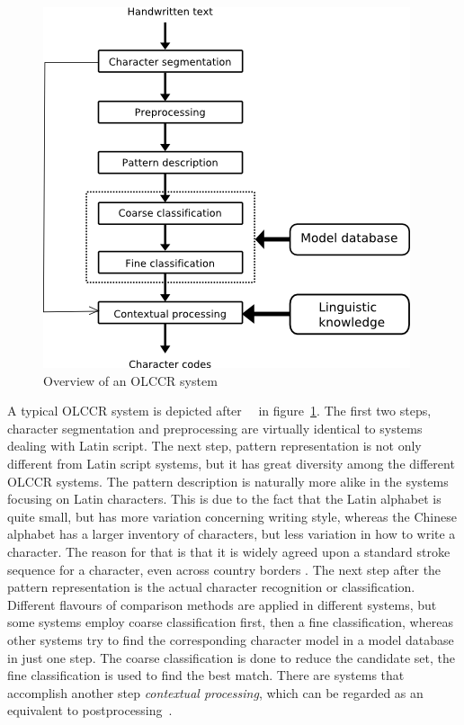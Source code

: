 \begin{figure}[htbp]
  \begin{center}
\includegraphics[scale=0.5]{images/olccrSystemOverview.png}
\caption{Overview of an OLCCR system}
\label{fig:olccrsystemoverview}
  \end{center}
\end{figure}

A typical OLCCR system is depicted 
after~~\citeyear{LiuJaegerNakagawa2004} in 
figure~\ref{fig:olccrsystemoverview}.
The first two steps, character segmentation and preprocessing are virtually
identical to systems dealing with Latin script. The next step, pattern 
representation is not only different from Latin script systems, but it has
great diversity among the different OLCCR systems.
The pattern description is naturally more alike in the systems focusing on 
Latin characters. This is due to the fact that the Latin alphabet is quite 
small, but has more variation concerning writing style, whereas the Chinese 
alphabet has a larger inventory of characters, but less variation in how to 
write a character. The reason for that is that it is widely agreed upon a 
standard stroke sequence for a character, even across country 
borders .
The next step after the pattern representation is the actual character 
recognition or classification. Different flavours of comparison methods are
applied in different systems, but some systems employ coarse classification 
first, then a fine classification, whereas other systems try to find the 
corresponding character model in a model database in just one step.
The coarse classification is done to reduce the candidate set, the fine 
classification is used to find the best match. There are systems that 
accomplish another step \emph{contextual processing}, which can be regarded 
as an equivalent to postprocessing~.

